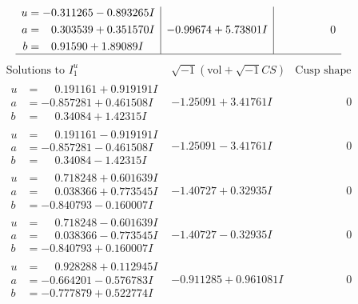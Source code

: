 \documentclass[1p]{elsarticle_modified}
\theoremstyle{definition}
\newcommand{\I}{\sqrt{-1}}
\begin{document}
$$\begin{array}{c|c|c}
\begin{aligned}
u &= -0.311265 - 0.893265 I \\
a &= \phantom{-}0.303539 + 0.351570 I \\
b &= \phantom{-}0.91590 + 1.89089 I\end{aligned}
 & -0.99674 + 5.73801 I & \phantom{-0.000000 } 0\\
 \hline 
 \end{array}$$\newpage$$\begin{array}{c|c|c}  
\text{Solutions to }I^u_{1}& \I (\text{vol} + \sqrt{-1}CS) & \text{Cusp shape}\\
 \hline 
\begin{aligned}
u &= \phantom{-}0.191161 + 0.919191 I \\
a &= -0.857281 + 0.461508 I \\
b &= \phantom{-}0.34084 + 1.42315 I\end{aligned}
 & -1.25091 + 3.41761 I & \phantom{-0.000000 } 0 \\ \hline\begin{aligned}
u &= \phantom{-}0.191161 - 0.919191 I \\
a &= -0.857281 - 0.461508 I \\
b &= \phantom{-}0.34084 - 1.42315 I\end{aligned}
 & -1.25091 - 3.41761 I & \phantom{-0.000000 } 0 \\ \hline\begin{aligned}
u &= \phantom{-}0.718248 + 0.601639 I \\
a &= \phantom{-}0.038366 + 0.773545 I \\
b &= -0.840793 - 0.160007 I\end{aligned}
 & -1.40727 + 0.32935 I & \phantom{-0.000000 } 0 \\ \hline\begin{aligned}
u &= \phantom{-}0.718248 - 0.601639 I \\
a &= \phantom{-}0.038366 - 0.773545 I \\
b &= -0.840793 + 0.160007 I\end{aligned}
 & -1.40727 - 0.32935 I & \phantom{-0.000000 } 0 \\ \hline\begin{aligned}
u &= \phantom{-}0.928288 + 0.112945 I \\
a &= -0.664201 - 0.576783 I \\
b &= -0.777879 + 0.522774 I\end{aligned}
 & -0.911285 + 0.961081 I & \phantom{-0.000000 } 0 \\ \hline\begin{aligned}

\end{aligned}
\end{array}$$
\end{document}
